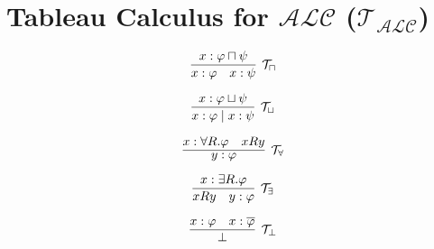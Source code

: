 \section{Tableau Calculus for $\mathcal{ALC}$ ($\mathcal{T}_{\mathcal{ALC}}$)}

\begin{multicols}{2}
    \noindent
    \begin{minipage}{\linewidth}
        \[
            \infer[\mathcal{T}_{\sqcap}]
            {x:\varphi \quad x:\psi}
            {x:\varphi \sqcap \psi}
        \]
    \end{minipage}

    \noindent
    \begin{minipage}{\linewidth}
        \[
            \infer[\mathcal{T}_{\sqcup}]
            {x:\varphi \mid x:\psi}
            {x:\varphi \sqcup \psi}
        \]
    \end{minipage}
\end{multicols}

\vspace{0.3cm}

\begin{multicols}{2}
    \noindent
    \begin{minipage}{\linewidth}
        \[
            \infer[\mathcal{T}_{\forall}]
            {y:\varphi}
            {x:\forall R. \varphi \quad x R y}
        \]
    \end{minipage}

    \noindent
    \begin{minipage}{\linewidth}
        \[
            \infer[\mathcal{T}_{\exists}]
            {x R y \quad y:\varphi}
            {x:\exists R. \varphi}
        \]
    \end{minipage}
\end{multicols}

\vspace{0.3cm}

\begin{minipage}{\linewidth}
    \[
        \infer[\mathcal{T}_{\bot}]
        {\bot}
        {x:\varphi \quad x:\overline{\varphi}}
    \]
\end{minipage}

